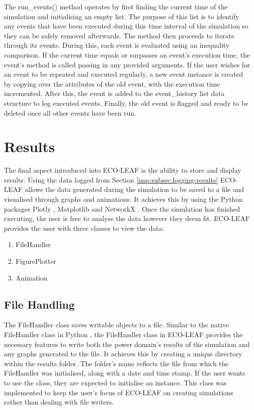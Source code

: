 \documentclass{l4proj}
\begin{document}
The run\_events() method operates by first finding the current time of the simulation and initialising an empty list.
The purpose of this list is to identify any events that have been executed during this time interval of the simulation so they can be safely removed afterwards.
The method then proceeds to iterate through its events.
During this, each event is evaluated using an inequality comparison.
If the current time equals or surpasses an event's execution time, the event's method is called passing in any provided arguments.
If the user wishes for an event to be repeated and executed regularly, a new event instance is created by copying over the attributes of the old event, with the execution time incremented.
After this, the event is added to the event\_history list data structure to log executed events.
Finally, the old event is flagged and ready to be deleted once all other events have been run.

\section{Results}\label{sec:displaying-results}
The final aspect introduced into ECO-LEAF is the ability to store and display results.
Using the data logged from Section \ref{imp:subsec:logging-results} ECO-LEAF allows the data generated during the simulation to be saved to a file and visualised through graphs and animations.
It achieves this by using the Python packages Plotly \citep{plotly-git}, Matplotlib \citep{Hunter:2007} and NetworkX \citep{networkx}.
Once the simulation has finished executing, the user is free to analyse the data however they deem fit.
ECO-LEAF provides the user with three classes to view the data:

\begin{enumerate}
    \item FileHandler
    \item FigurePlotter
    \item Animation
\end{enumerate}

\subsection{File Handling}\label{subsec:imp:filehandler}
The FileHandler class saves writable objects to a file.
Similar to the native FileHandler class in Python \citep{python-docs-FileHandler}, the FileHandler class in ECO-LEAF provides the necessary features to write both the power domain's results of the simulation and any graphs generated to the file.
It achieves this by creating a unique directory within the results folder. The folder's name reflects the file from which the FileHandler was initialised, along with a date and time stamp.
If the user wants to use the class, they are expected to initialise an instance.
This class was implemented to keep the user's focus of ECO-LEAF on creating simulations rather than dealing with file writers.
\end{document}
